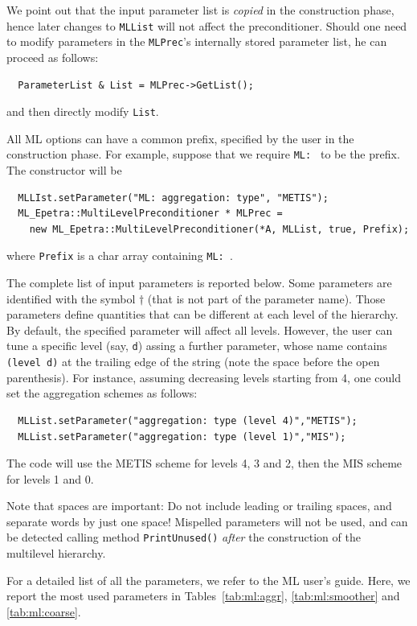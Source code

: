 We point out that the input parameter list is {\sl copied} in the
construction phase, hence later changes to \verb!MLList! will not affect
the preconditioner. Should one need to modify parameters in the
\verb!MLPrec!'s internally stored parameter list, he can proceed as
follows:
\begin{verbatim}
  ParameterList & List = MLPrec->GetList();
\end{verbatim}
and then directly modify \verb!List!.

\medskip

All ML options can have a common prefix, specified by the
user in the construction phase. For example, suppose that we require
\verb!ML: ! to be the prefix. The constructor will be
\begin{verbatim}
  MLLIst.setParameter("ML: aggregation: type", "METIS");
  ML_Epetra::MultiLevelPreconditioner * MLPrec = 
    new ML_Epetra::MultiLevelPreconditioner(*A, MLList, true, Prefix);
\end{verbatim}
where \verb!Prefix! is a char array containing \verb!ML: !.

The complete list of input parameters is reported below. Some parameters
are identified with the symbol $\dagger$ (that is not part of the
parameter name). Those parameters define quantities that can be
different at each level of the hierarchy. By default, the specified
parameter will affect all levels. However, the user can tune a specific
level (say, \verb!d!) assing a further parameter, whose name contains
\verb! (level d)! at the trailing edge of the string (note the space
before the open parenthesis). For instance,  assuming
decreasing levels starting from 4, one could set the aggregation schemes
as follows:
\begin{verbatim}
  MLList.setParameter("aggregation: type (level 4)","METIS");
  MLList.setParameter("aggregation: type (level 1)","MIS");
\end{verbatim}
The code will use the METIS scheme for levels 4, 3 and 2, then the MIS
scheme for levels 1 and 0.

Note that spaces are important: Do not include leading or trailing
spaces, and separate words by just one space! Mispelled parameters will
not be used, and can be detected calling method \verb!PrintUnused()!
{\sl after} the construction of the multilevel hierarchy. 

For a detailed list of all the parameters, we refer to the ML user's
guide.  Here, we report the most used parameters in
Tables~\ref{tab:ml:aggr}, \ref{tab:ml:smoother} and \ref{tab:ml:coarse}.


